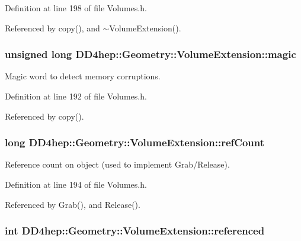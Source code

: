 Definition at line 198 of file Volumes.h.

Referenced by copy(), and $\sim$VolumeExtension().\hypertarget{class_d_d4hep_1_1_geometry_1_1_volume_extension_ac2ad71bb6a554c749f06c8cce9a8fe8a}{
\subsubsection[{magic}]{\setlength{\rightskip}{0pt plus 5cm}unsigned long {\bf DD4hep::Geometry::VolumeExtension::magic}}}
\label{class_d_d4hep_1_1_geometry_1_1_volume_extension_ac2ad71bb6a554c749f06c8cce9a8fe8a}


Magic word to detect memory corruptions. 

Definition at line 192 of file Volumes.h.

Referenced by copy().\hypertarget{class_d_d4hep_1_1_geometry_1_1_volume_extension_a604559432eb0145b52013c5105a2566b}{
\subsubsection[{refCount}]{\setlength{\rightskip}{0pt plus 5cm}long {\bf DD4hep::Geometry::VolumeExtension::refCount}}}
\label{class_d_d4hep_1_1_geometry_1_1_volume_extension_a604559432eb0145b52013c5105a2566b}


Reference count on object (used to implement Grab/Release). 

Definition at line 194 of file Volumes.h.

Referenced by Grab(), and Release().\hypertarget{class_d_d4hep_1_1_geometry_1_1_volume_extension_aa73b0b45a2b7112a60e9616da6edcde4}{
\subsubsection[{referenced}]{\setlength{\rightskip}{0pt plus 5cm}int {\bf DD4hep::Geometry::VolumeExtension::referenced}}}
\label{class_d_d4hep_1_1_geometry_1_1_volume_extension_aa73b0b45a2b7112a60e9616da6edcde4}


